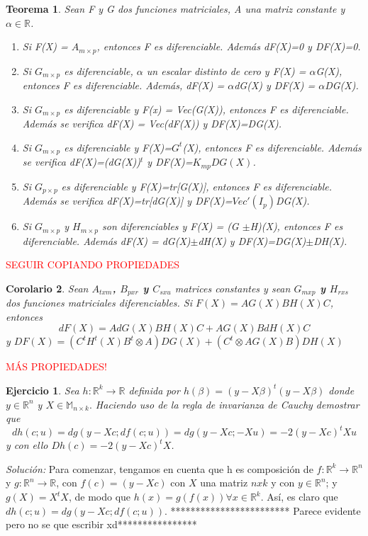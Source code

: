 \documentclass{article}
\theoremstyle{theorem-style}  %
\newtheorem{theorem}{Teorema}[section]  %
\newtheorem{corollary}[theorem]{Corolario} %
\theoremstyle{definition-style}
\theoremstyle{example-style}
\theoremstyle{exercise-style}
\newtheorem{exercise}{Ejercicio}[section]
\begin{document}
\begin{theorem}
	Sean F y G dos funciones matriciales, A una matriz constante y $\alpha \in \mathbb{R}$.
	\begin{enumerate}
		\item Si F(X) = $A_{m\times p}$, entonces F es diferenciable. Además dF(X)=0 y DF(X)=0.
		\item Si $G_{m\times p}$ es diferenciable, $\alpha$ un escalar distinto de cero y F(X) = $\alpha$G(X), entonces F es diferenciable. Además, dF(X) = $\alpha$dG(X) y DF(X) = $\alpha$DG(X).
		\item Si $G_{m\times p}$ es diferenciable y F(x) = Vec(G(X)), entonces F es diferenciable. Además se verifica dF(X) = Vec(dF(X))  y DF(X)=DG(X).
		\item Si $G_{m\times p}$ es diferenciable y F(X)=$G^t$(X), entonces F es diferenciable. Además se verifica dF(X)=(dG(X))$^t$ y DF(X)=$K_{mp}DG(X)$.
		\item Si $G_{p\times p}$ es diferenciable y F(X)=tr[G(X)], entonces F es diferenciable. Además se verifica dF(X)=tr[dG(X)] y DF(X)=$Vec'(I_p)$DG(X).
		\item Si $G_{m\times p}$ y $H_{m\times p}$ son diferenciables y F(X) = (G $\pm$H)(X), entonces F es diferenciable. Además dF(X) = dG(X)$\pm$dH(X) y DF(X)=DG(X)$\pm$DH(X).
	\end{enumerate}
\end{theorem}

\textcolor{red}{SEGUIR COPIANDO PROPIEDADES}

\begin{corollary}
	Sean \textbf{$A_{txm}$, $B_{pxr}$ y $C_{sxu}$} matrices constantes y sean \textbf{$G_{mxp}$ y $H_{rxs}$} dos funciones matriciales diferenciables. Si \textbf{$F(X) = AG(X)BH(X)C$}, entonces
	\textbf{$$ dF(X)= AdG(X)BH(X)C + AG(X)BdH(X)C $$}
	y \textbf{$DF(X)= (C^tH^t(X)B^t \otimes A)DG(X) + (C^t \otimes AG(X)B)DH(X)$} 
\end{corollary}

\textcolor{red}{MÁS PROPIEDADES!}

\begin{exercise}
	Sea $h: \mathbb{R}^k \rightarrow \mathbb{R}$ definida por $h(\beta) = (y-X\beta)^t(y-X\beta)$ donde $y \in \mathbb{R}^n$ y $X\in\mathbb{M}_{n\times k}.$ Haciendo uso de la regla de invarianza de Cauchy demostrar que
	$$dh(c;u) = dg(y-Xc;df(c;u)) = dg(y-Xc;-Xu)=-2(y-Xc)^tXu$$
	y con ello $Dh(c)=-2(y-Xc)^tX$.
\end{exercise}
\textit{Solución: }
Para comenzar, tengamos en cuenta que h es composición de $f: \mathbb{R}^k \rightarrow \mathbb{R}^n$ y $g:\mathbb{R}^n \rightarrow \mathbb{R}$, con $f(c) = (y-Xc)$ con $X$ una matriz $nxk$ y con $y \in \mathbb{R}^n$; y $g(X) = X^tX$, de modo que $h(x)=g(f(x)) \forall x \in  \mathbb{R}^k$. Así, es claro que  $dh(c;u) = dg(y-Xc;df(c;u))$. ************************ Parece evidente pero no se que escribir xd****************
\end{document}
